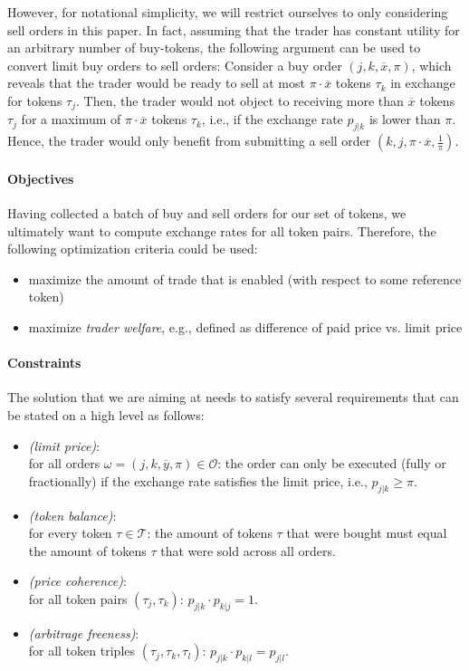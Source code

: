 \documentclass[11pt,parskip=full]{scrartcl}%
\newcommand*{\ie}{i.e., }
\newcommand*{\eg}{e.g., }
\newcommand*{\wrt}{with respect to }
\newcommand*{\tokens}{\mathcal{T}}          %
\newcommand*{\orders}{\mathcal{O}}          %
\begin{document}
However, for notational simplicity, we will restrict ourselves to only considering sell orders in
this paper.
In fact, assuming that the trader has constant utility for an arbitrary number of buy-tokens,
the following argument can be used to convert limit buy orders to sell orders:
Consider a buy order $ (j,k,\overline{x},\pi) $, which reveals that the trader would be ready to
sell at most $ \pi \cdot \overline{x} $ tokens $ \tau_k $ in exchange for tokens $ \tau_j $.
Then, the trader would not object to receiving more than $ \overline{x} $ tokens $ \tau_j $ for a
maximum of $ \pi \cdot \overline{x} $ tokens $ \tau_k $, \ie if the exchange rate $ p_{j|k} $ is
lower than $ \pi $.
Hence, the trader would only benefit from submitting a sell order
$ (k,j,\pi \cdot \overline{x},\frac{1}{\pi}) $.

\paragraph{Objectives}

Having collected a batch of buy and sell orders for our set of tokens, we ultimately want to
compute exchange rates for all token pairs.
Therefore, the following optimization criteria could be used:
\begin{itemize}
  \item maximize the amount of trade that is enabled (\wrt some reference token)
  \item maximize \emph{trader welfare}, \eg defined as difference of paid price vs. limit price
\end{itemize}


\paragraph{Constraints}

The solution that we are aiming at needs to satisfy several requirements that can be stated on a
high level as follows:
\begin{itemize}
  \item \emph{(limit price)}:\\
  for all orders
  $ \omega = (j,k,\overline{y},\pi) \in \orders $:
  the order can only be executed (fully or fractionally) if the exchange rate satisfies the
  limit price, \ie $ p_{j|k} \ge \pi $.
  \item \emph{(token balance)}:\\
  for every token $ \tau \in \tokens $: the amount of tokens $ \tau $ that were bought must
  equal the amount of tokens $ \tau $ that were sold across all orders.
  \item \emph{(price coherence)}:\\
  for all token pairs $ (\tau_j,\tau_k) $: $ p_{j|k} \cdot p_{k|j} = 1 $.
  \item \emph{(arbitrage freeness)}:\\
  for all token triples $ (\tau_j,\tau_k,\tau_l) $: $ p_{j|k} \cdot p_{k|l} = p_{j|l} $.
\end{itemize}
\end{document}
